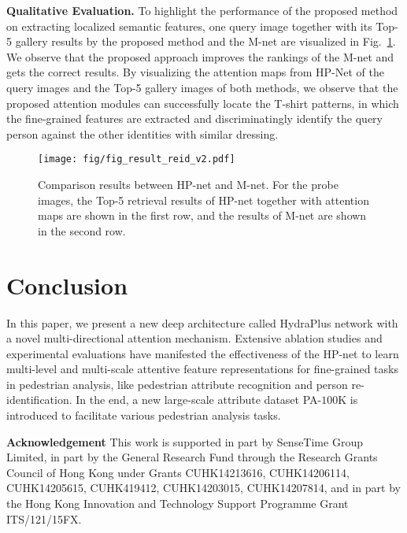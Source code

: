 \documentclass[10pt,twocolumn,letterpaper]{article}
\begin{document}
\vspace{+0.1cm}
\noindent\textbf{Qualitative Evaluation.}
%
To highlight the performance of the proposed method on extracting localized semantic features, one query image together with its Top-5 gallery results by the proposed method and the M-net are visualized in Fig.~\ref{fig:result_reid}.
%
We observe that the proposed approach improves the rankings of the M-net and gets the correct results.
%
By visualizing the attention maps from HP-Net of the query images and the Top-5 gallery images of both methods, we observe that the proposed attention modules can successfully locate the T-shirt patterns, in which the fine-grained features are extracted and discriminatingly identify the query person against the other identities with similar dressing.
%
\


\begin{figure}[t]
\small
\centering
\texttt{[image: fig/fig\_result\_reid\_v2.pdf]}
\caption{
Comparison results between HP-net and M-net. For the probe images, the Top-5 retrieval results of HP-net together with attention maps are shown in the first row, and the results of M-net are shown in the second row.
}
\label{fig:result_reid}
\end{figure}


\section{Conclusion}
\label{sec:conclusion}
\vspace{-0.1cm}
In this paper, we present a new deep architecture called HydraPlus network with a novel multi-directional attention mechanism.
%
Extensive ablation studies and experimental evaluations have manifested the effectiveness of the HP-net to learn multi-level and multi-scale attentive feature representations for fine-grained tasks in pedestrian analysis, like pedestrian attribute recognition and person re-identification.
%
In the end, a new large-scale attribute dataset PA-$100$K is introduced to facilitate various pedestrian analysis tasks.

\vspace{+5pt}
\noindent\textbf{Acknowledgement} This work is supported in part by SenseTime Group Limited, in part by the General Research Fund through the Research Grants Council of Hong Kong under Grants CUHK14213616, CUHK14206114, CUHK14205615, CUHK419412, CUHK14203015, CUHK14207814, and in part by the Hong Kong Innovation and Technology Support Programme Grant ITS/121/15FX.





{\small


}
\end{document}
